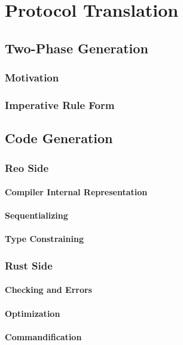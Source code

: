 \chapter{Protocol Translation}
\section{Two-Phase Generation}
\subsection{Motivation}
\subsection{Imperative Rule Form}
\section{Code Generation}
\subsection{Reo Side}
\subsubsection{Compiler Internal Representation}
\subsubsection{Sequentializing}
\subsubsection{Type Constraining}
\subsection{Rust Side}
\subsubsection{Checking and Errors}
\subsubsection{Optimization}
\subsubsection{Commandification}